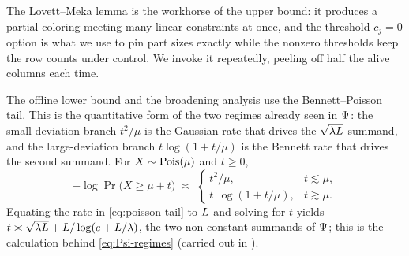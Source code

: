 The Lovett--Meka lemma is the workhorse of the upper bound: it produces a partial coloring meeting many linear constraints
at once, and the threshold $c_j=0$ option is what we use to pin part sizes exactly while the nonzero thresholds keep the row
counts under control. We invoke it repeatedly, peeling off half the alive columns each time.

The offline lower bound and the broadening analysis use the Bennett--Poisson tail. This is the quantitative form of the two
regimes already seen in $\Psi$: the small-deviation branch $t^2/\mu$ is the Gaussian rate that drives the
$\sqrt{\lambda L}$ summand, and the large-deviation branch $t\log(1+t/\mu)$ is the Bennett rate that drives the second
summand. For $X\sim\mathrm{Pois}(\mu)$ and $t\ge0$,
\begin{equation}\label{eq:poisson-tail}
  -\log\Pr\big(X\ge \mu+t\big)\ \asymp\
  \begin{cases}
    t^2/\mu, & t\lesssim\mu,\\
    t\,\log(1+t/\mu), & t\gtrsim\mu.
  \end{cases}
\end{equation}
Equating the rate in \eqref{eq:poisson-tail} to $L$ and solving for $t$ yields
$t\asymp\sqrt{\lambda L}+L/\log(e+L/\lambda)$, the two non-constant summands of $\Psi$; this is the
calculation behind \eqref{eq:Psi-regimes} (carried out in \Cref{sec:offline-lower}).
